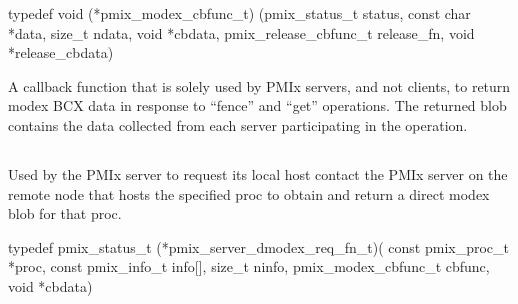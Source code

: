 \cspecificstart
\begin{codepar}
typedef void (*pmix_modex_cbfunc_t)
    (pmix_status_t status,
     const char *data, size_t ndata,
     void *cbdata,
     pmix_release_cbfunc_t release_fn,
     void *release_cbdata)
\end{codepar}
\cspecificend

\begin{arglist}
\end{arglist}

\descr

A callback function that is solely used by PMIx servers, and not clients, to return modex \ac{BCX} data in response to ``fence'' and ``get'' operations.
The returned blob contains the data collected from each server participating in the operation.


\subsection{}

\summary

Used by the PMIx server to request its local host contact the \ac{PMIx} server on the remote node that hosts the specified proc to obtain and return a direct modex blob for that proc.

\format

\cspecificstart
\begin{codepar}
typedef pmix_status_t (*pmix_server_dmodex_req_fn_t)(
                             const pmix_proc_t *proc,
                             const pmix_info_t info[],
                             size_t ninfo,
                             pmix_modex_cbfunc_t cbfunc,
                             void *cbdata)
\end{codepar}
\cspecificend

\begin{arglist}
\end{arglist}

